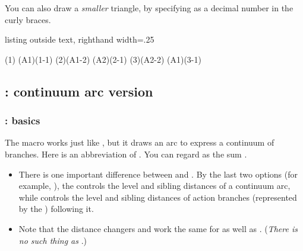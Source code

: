 You can also draw a \emph{smaller} triangle, by specifying  as a decimal number in the curly braces.

\begin{tcblisting}{listing outside text, righthand width=.25\linewidth}
\begin{istgame}[font=\scriptsize]
\cntmdistance*{10mm}{20mm}
\istrootcntm(1)
  \istb        \endist
\istroot(A1)(1-1)
  \istb \istb  \endist
\istrootcntm(2)(A1-2)
  \istb        \endist
\istroot(A2)(2-1)
  \istb \istb  \endist
{} %
\istrootcntm(3)(A2-2)
  \istb \istbm \endist
\istroot(A1)(3-1)
  \istb \istb  \endist
\end{istgame}
\end{tcblisting}


\subsection{\protect\cmd{\istrootcntmA}: continuum arc version}
\label{ssec:istrootcntmA}

\subsubsection{\protect\cmd{\istrootcntmA}: basics}
\label{ssec:cntmA}

The macro \icmd{\istrootcntmA} works just like \cmd{\istroot}, but it draws an arc to express a continuum of branches. Here  is an abbreviation of . 
You can regard \cmd{\istrootcntmA} as the sum \cmd{\istroot} \xw{+} .

\remark
\begin{itemize}\tightlist
\item
There is one important difference between \cmd{\istroot} and \cmd{\istrootcntmA}. By the last two options (for example, ), the \cmd{\istrootcntmA} controls the level and sibling distances of a continuum arc, while \cmd{\istroot} controls the level and sibling distances of action branches (represented by the \cmd{\istb}) following it.
\item
Note that the distance changers \cmd{\cntmdistance} and \cmd{\cntmdistance*} work the same for \cmd{\istrootcntmA} as well as \cmd{\istrootcntm}. (\emph{There is no such thing as \cmd{\cntmAdistance}}.)
\end{itemize}

